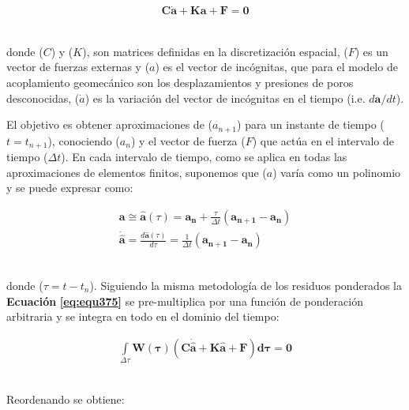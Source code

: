 \begin{ceqn} %
\begin{gather}\label{eq:equ375}
 \mathbf{C}\mathbf{\dot{a}} + \mathbf{K}\mathbf{a} + \mathbf{F} = \mathbf{0}
\end{gather}   
\end{ceqn}
\\
donde ($C$) y ($K$), son matrices definidas en la discretización espacial, ($F$) es un vector de fuerzas externas y ($a$) es el vector de incógnitas, que para el modelo de acoplamiento geomecánico son los desplazamientos y presiones de poros desconocidas, ($\dot{a}$) es la variación del vector de incógnitas en el tiempo (i.e. $d\mathbf{a}/dt$).\bigskip

El objetivo es obtener aproximaciones de ($a_{n+1}$) para un instante de tiempo ($t=t_{n+1}$), conociendo ($a_{n}$) y el vector de fuerza ($F$) que actúa en
el intervalo de tiempo ($\Delta t$). En cada intervalo de tiempo, como se aplica en todas las aproximaciones de elementos finitos, suponemos que ($a$) varía como un polinomio y se puede expresar como:

\begin{ceqn} 
\begin{subequations} \label{eq:equ376} 
\begin{gather}
\mathbf{a} \cong  \mathbf{\hat{a}}(\tau) = \mathbf{a_n} + \frac{\tau}{\Delta t}(\mathbf{a_{n+1}} - \mathbf{a_n})\label{eq:equ376a}\\[12pt]
\mathbf{\dot{\hat{a}}} = \frac{d\mathbf{\hat{a}}(\tau)}{d\tau}  = \frac{1}{\Delta t}(\mathbf{a_{n+1}} - \mathbf{a_n}) \label{eq:equ376b}
\end{gather}  
\end{subequations} 
\end{ceqn}
\\
donde ($\tau = t-t_n$). Siguiendo la misma metodología de los residuos ponderados la \textbf{Ecuación} \textbf{\ref{eq:equ375}} se pre-multiplica por una función de ponderación arbitraria y se integra en todo en el dominio del tiempo:

\begin{ceqn} %
\begin{gather}\label{eq:equ377}
 \int\limits_{\Delta \tau} \mathbf{W(\tau)}\left(\mathbf{C}\mathbf{\dot{\hat{a}}} + \mathbf{K}\mathbf{\hat{a}} + \mathbf{F}\right)\mathbf{d\tau} = \mathbf{0}
\end{gather}   
\end{ceqn}
\\
Reordenando se obtiene:

